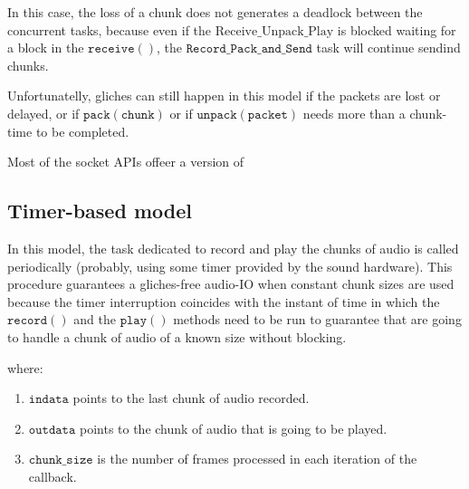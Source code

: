 In this case, the loss of a chunk does not generates a deadlock
between the concurrent tasks, because even if the
$\mathrm{Receive\_Unpack\_Play}$ is blocked waiting for a block in the
$\mathtt{receive()}$, the $\mathtt{Record\_Pack\_and\_Send}$ task will
continue sendind chunks.

Unfortunatelly, gliches can still happen in this model if the packets
are lost or delayed, or if $\mathtt{pack(chunk)}$ or if
$\mathtt{unpack(packet)}$ needs more than a chunk-time to be
completed.

Most of the socket APIs offeer a version of 

\subsection{Timer-based model}

In this model, the task dedicated to record and play the chunks of
audio is called periodically (probably, using some timer provided by
the sound hardware). This procedure guarantees a gliches-free audio-IO
when constant chunk sizes are used because the timer interruption
coincides with the instant of time in which the $\mathtt{record()}$
and the $\mathtt{play()}$ methods need to be run to guarantee that are
going to handle a chunk of audio of a known size without blocking.

\begin{pseudocode}{Timer-based\_InterCom}{~}
  \BEGIN
     \GETS {}\\
    \\
    \mathtt{
    \mathtt{send(outgoing\_packet)}\\
    \mathtt{play}(\mathtt{chunk\_to\_play})\\
  \END
  \ENDPROCEDURE
\end{pseudocode}

where:
\begin{enumerate}
\item $\mathtt{indata}$ points to the last chunk of audio recorded.
\item $\mathtt{outdata}$ points to the chunk of audio that is going to be played.
\item $\mathtt{chunk\_size}$ is the number of frames processed in each iteration of the callback.
\end{enumerate}

